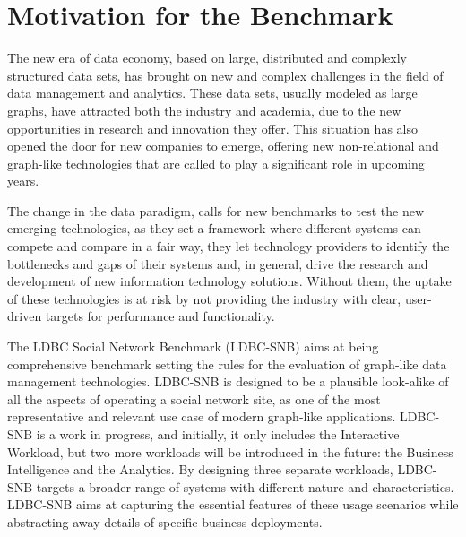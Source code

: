 

\section{Motivation for the Benchmark}

The new era of data economy, based on large, distributed and complexly
structured data sets, has brought on new and complex challenges in the field of
data management and analytics. These data sets, usually modeled as large
graphs, have attracted both the industry and academia, due to the new
opportunities in research and innovation they offer.  This situation has also
opened the door for new companies to emerge, offering new non-relational and
graph-like technologies that are called to play a significant role in upcoming
years.

The change in the data paradigm, calls for new benchmarks to test the  new
emerging technologies, as they set a framework where different systems can
compete and compare in a fair way, they let technology providers to identify
the bottlenecks and gaps of their systems and, in general, drive the research
and development of new information technology solutions. Without them, the
uptake of these technologies is at risk by not providing the industry with
clear, user-driven targets for performance and functionality.

The LDBC Social Network Benchmark (LDBC-SNB) aims at being comprehensive
benchmark setting the rules for the evaluation of graph-like data management
technologies.  LDBC-SNB is designed to be a plausible look-alike of all the
aspects of operating a social network site, as one of the most representative
and relevant use case of modern graph-like applications. LDBC-SNB is a work in
progress, and initially, it only includes the Interactive Workload,
but two more workloads will be introduced in the future: the Business
Intelligence and the Analytics. By designing three separate workloads, LDBC-SNB
targets a broader range of systems with different nature and characteristics.
LDBC-SNB aims at capturing the essential features of these usage scenarios
while abstracting away details of specific business deployments. 



